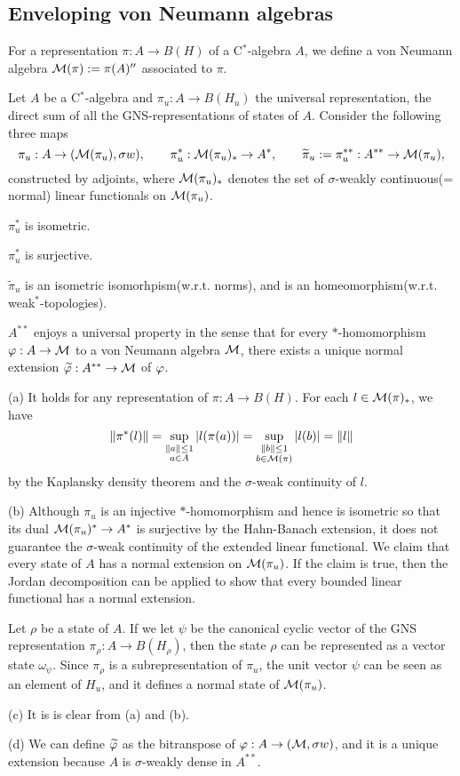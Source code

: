 \documentclass{../../../small}
\begin{document}
\subsection{Enveloping von Neumann algebras}
\begin{defn}
For a representation $\pi:A\to B(H)$ of a C$^*$-algebra $A$, we define a von Neumann algebra $\mathcal{M}(\pi):=\pi(A)''$ associated to $\pi$.
\end{defn}

\begin{thm}
Let $A$ be a C$^*$-algebra and $\pi_u:A\to B(H_u)$ the universal representation, the direct sum of all the GNS-representations of states of $A$.
Consider the following three maps
\[\pi_u:A\to(\mathcal{M}(\pi_u),\sigma w),\qquad\pi_u^*:\mathcal{M}(\pi_u)_*\to A^*,\qquad\widetilde\pi_u:=\pi_u^{**}:A^{**}\to\mathcal{M}(\pi_u),\]
constructed by adjoints, where $\mathcal{M}(\pi_u)_*$ denotes the set of $\sigma$-weakly continuous(= normal) linear functionals on $\mathcal{M}(\pi_u)$.
\begin{parts}
\item $\pi_u^*$ is isometric.
\item $\pi_u^*$ is surjective.
\item $\tilde\pi_u$ is an isometric isomorhpism(w.r.t. norms), and is an homeomorphism(w.r.t. weak$^*$-topologies).
\item $A^{**}$ enjoys a universal property in the sense that for every $*$-homomorphism $\varphi:A\to\mathcal{M}$ to a von Neumann algebra $\mathcal{M}$, there exists a unique normal extension $\widetilde{\varphi}:A^{**}\to\mathcal{M}$ of $\varphi$.
\end{parts}
\end{thm}
\begin{pf}
(a)
It holds for any representation of $\pi:A\to B(H)$.
For each $l\in\mathcal{M}(\pi)_*$, we have
\[\|\pi^*(l)\|=\sup_{\substack{\|a\|\le1\\a\in A}}|l(\pi(a))|=\sup_{\substack{\|b\|\le1\\b\in\mathcal{M}(\pi)}}|l(b)|=\|l\|\] by the Kaplansky density theorem and the $\sigma$-weak continuity of $l$.

(b)
Although $\pi_u$ is an injective $*$-homomorphism and hence is isometric so that its dual $\mathcal{M}(\pi_u)^*\to A^*$ is surjective by the Hahn-Banach extension, it does not guarantee the $\sigma$-weak continuity of the extended linear functional.
We claim that every state of $A$ has a normal extension on $\mathcal{M}(\pi_u)$.
If the claim is true, then the Jordan decomposition can be applied to show that every bounded linear functional has a normal extension.

Let $\rho$ be a state of $A$.
If we let $\psi$ be the canonical cyclic vector of the GNS representation $\pi_\rho:A\to B(H_\rho)$, then the state $\rho$ can be represented as a vector state $\omega_\psi$.
Since $\pi_\rho$ is a subrepresentation of $\pi_u$, the unit vector $\psi$ can be seen as an element of $H_u$, and it defines a normal state of $\mathcal{M}(\pi_u)$.

(c)
It is is clear from (a) and (b).

(d)
We can define $\widetilde{\varphi}$ as the bitranspose of $\varphi:A\to(\mathcal{M},\sigma w)$, and it is a unique extension because $A$ is $\sigma$-weakly dense in $A^{**}$.
\end{pf}
\end{document}
